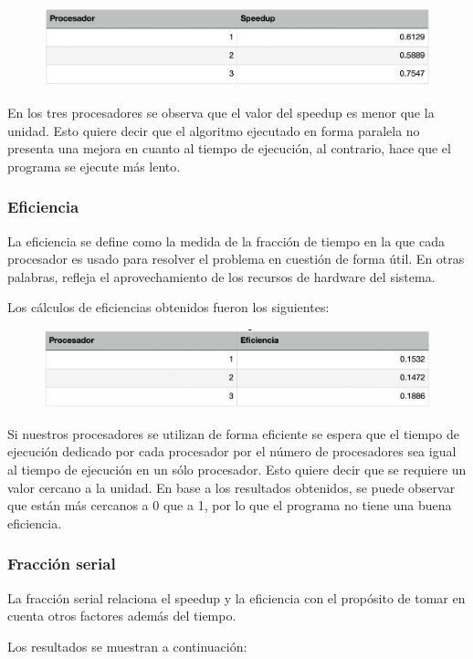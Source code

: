 \documentclass[11pt]{article}
\begin{document}
\begin{figure}[!htbp]
\centering
\includegraphics[width=1\linewidth]{speedup}
\end{figure}

En los tres procesadores se observa que el valor del speedup es menor que la unidad. Esto quiere decir que el algoritmo ejecutado en forma paralela no presenta una mejora en cuanto al tiempo de ejecución, al contrario, hace que el programa se ejecute más lento.

\subsubsection{Eficiencia}
La eficiencia se define como la medida de la fracción de tiempo en la que cada procesador es usado para resolver el problema en cuestión de forma útil. En otras palabras, refleja el aprovechamiento de los recursos de hardware del sistema.
\par
Los cálculos de eficiencias obtenidos fueron los siguientes:

\begin{figure}[!htbp]
\centering
\includegraphics[width=1\linewidth]{eficiencia}
\end{figure}

Si nuestros procesadores se utilizan de forma eficiente se espera que el tiempo de ejecución dedicado por cada procesador por el número de procesadores sea igual al tiempo de ejecución en un sólo procesador. Esto quiere decir que se requiere un valor cercano a la unidad. En base a los resultados obtenidos, se puede observar que están más cercanos a 0 que a 1, por lo que el programa no tiene una buena eficiencia.

\subsubsection{Fracción serial}
La fracción serial relaciona el speedup y la eficiencia con el propósito de tomar en cuenta otros factores además del tiempo.
\par
Los resultados se muestran a continuación:
\end{document}

